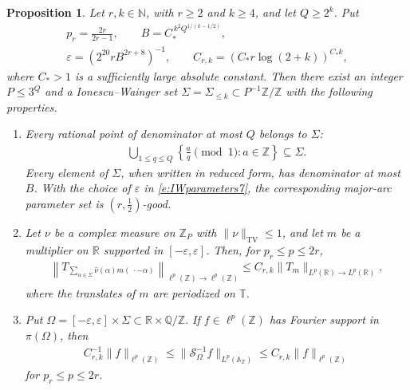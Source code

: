 \documentclass[12pt,reqno]{amsart}
\numberwithin{equation}{section}
\newtheorem{proposition}[equation]{Proposition}
\theoremstyle{definition}
\theoremstyle{remark}
\begin{document}
\begin{proposition}
\label{p:IWinput7}
Let \(r,k\in\mathbb N\), with \(r\geq2\) and \(k\geq4\),
and let \(Q\geq2^k\). Put
\begin{equation}\label{e:IWparameters7}
 \begin{gathered}
 p_r=\frac{2r}{2r-1},
 \qquad B=C_*^{\,k^2Q^{1/(k-1/2)}},\\
 \varepsilon=(2^{20}rB^{2r+8})^{-1},
 \qquad C_{r,k}=(C_*r\log(2+k))^{C_*k},
 \end{gathered}
\end{equation}
where \(C_*>1\) is a sufficiently large absolute constant.
Then there exist an integer \(P\leq3^Q\) and a
Ionescu--Wainger set
\(\Sigma=\Sigma_{\leq k}\subset P^{-1}\mathbb Z/\mathbb Z\)
with the following properties.

\begin{enumerate}[label=\textup{(\roman*)}]
\item
Every rational point of denominator at most \(Q\) belongs to
\(\Sigma\):
\begin{align}\label{e:IWcontainment7}
 \bigcup_{1\leq q\leq Q}
 \left\{\frac aq\pmod1:a\in\mathbb Z\right\}
 \subseteq\Sigma.
\end{align}
Every element of \(\Sigma\), when written in reduced form, has
denominator at most \(B\). With the choice of \(\varepsilon\) in \eqref{e:IWparameters7}, the
corresponding major-arc parameter set is
\((r,\frac12)\)-good.

\item
Let \(\nu\) be a complex measure on \(\mathbb Z_P\) with
\(\|\nu\|_{\mathrm{TV}}\leq1\), and let \(m\) be a multiplier on
\(\mathbb R\) supported in \([-\varepsilon,\varepsilon]\).  Then, for
\(p_r\leq p\leq2r\),
\begin{align}\label{e:IWmultiplier7}
 \left\|
 T_{\displaystyle
   \sum_{\alpha\in\Sigma}
   \widehat\nu(\alpha)m(\,\cdot-\alpha)}
 \right\|_{\ell^p(\mathbb Z)\to\ell^p(\mathbb Z)}
 \leq
  C_{r,k}
 \|T_m\|_{L^p(\mathbb R)\to L^p(\mathbb R)},
\end{align}
where the translates of \(m\) are periodized on \(\mathbb T\).

\item
Put $\Omega=[-\varepsilon,\varepsilon]\times\Sigma
 \subset\mathbb R\times\mathbb Q/\mathbb Z.$
If \(f\in\ell^p(\mathbb Z)\) has Fourier support in
\(\pi(\Omega)\), then
\begin{align}\label{e:IWsampling7}
  C_{r,k}^{-1}\|f\|_{\ell^p(\mathbb Z)}
 \leq
 \|\mathcal S_\Omega^{-1}f\|_{L^p(\mathbb A_{\mathbb Z})}
 \leq
  C_{r,k}\|f\|_{\ell^p(\mathbb Z)}
\end{align}
for \(p_r\leq p\leq2r\).


\end{enumerate}
\end{proposition}
\end{document}
